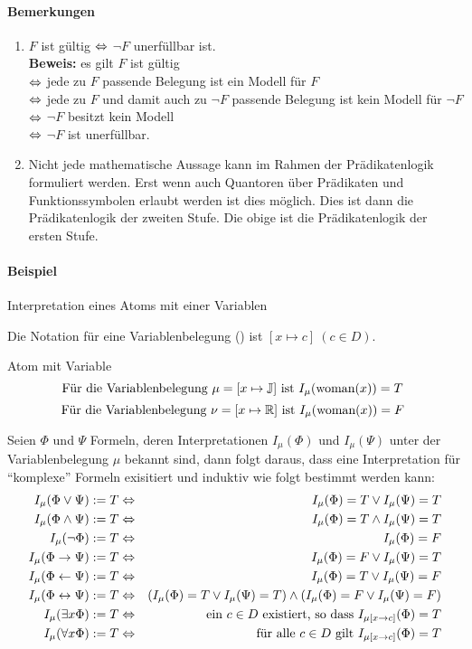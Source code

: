 \documentclass[a4paper]{scrartcl}
\begin{document}
\paragraph{Bemerkungen}
\begin{enumerate}
\item $F$ ist gültig $\Leftrightarrow$ $\neg F$ unerfüllbar ist.\\ \textbf{Beweis:} es gilt $F$ ist gültig 
	\\$\Leftrightarrow$ jede zu $F$ passende Belegung ist ein Modell für $F$ 
	\\$\Leftrightarrow$ jede zu $F$ und damit auch zu $\neg F$ passende Belegung ist kein Modell für $\neg F$ 
	\\$\Leftrightarrow$ $\neg F$ besitzt kein Modell 
	\\$\Leftrightarrow$ $\neg F$ ist unerfüllbar.
\item Nicht jede mathematische Aussage kann im Rahmen der Prädikatenlogik formuliert werden. Erst wenn auch Quantoren über Prädikaten und Funktionssymbolen erlaubt werden ist dies möglich. Dies ist dann die Prädikatenlogik der zweiten Stufe. Die obige ist die Prädikatenlogik der ersten Stufe.
\end{enumerate}

\paragraph{Beispiel} Interpretation eines Atoms mit einer Variablen 

Die Notation für eine Variablenbelegung () ist $[x \mapsto c] \ (c \in D)$.

Atom mit Variable
	$$\text{Für die Variablenbelegung $\mu=[x \mapsto \mathbb{J}] \text{ ist } I_\mu(\text{woman}(x))=T$ }$$
	$$\text{Für die Variablenbelegung $\nu=[x \mapsto \mathbb{R}] \text{ ist } I_\mu(\text{woman}(x))=F$ }$$

Seien $\Phi$ und $\Psi$ Formeln, deren Interpretationen $I_\mu(\Phi)$ und $I_\mu(\Psi)$ unter der Variablenbelegung $\mu$ bekannt sind, dann folgt daraus, dass eine Interpretation für "`komplexe"' Formeln exisitiert und induktiv wie folgt bestimmt werden kann:
\begin{eqnarray*}
I_\mu(\Phi \vee \Psi) := T & \Leftrightarrow & I_\mu(\Phi)=T \vee I_\mu(\Psi)=T \\
I_\mu(\Phi \wedge \Psi) := T & \Leftrightarrow & I_\mu(\Phi)=T \wedge I_\mu(\Psi)=T \\
I_\mu(\neg \Phi) := T & \Leftrightarrow & I_\mu(\Phi)=F \\
I_\mu(\Phi \rightarrow \Psi) := T & \Leftrightarrow & I_\mu(\Phi)=F \vee I_\mu(\Psi)=T \\
I_\mu(\Phi \leftarrow \Psi) := T & \Leftrightarrow & I_\mu(\Phi)=T \vee I_\mu(\Psi)=F \\
I_\mu(\Phi \leftrightarrow \Psi) := T & \Leftrightarrow & (I_\mu(\Phi)=T \vee I_\mu(\Psi)=T) \wedge (I_\mu(\Phi)=F \vee I_\mu(\Psi)=F) \\
I_\mu(\exists x \Phi) := T & \Leftrightarrow & \text{ein $c \in D$ existiert, so dass $I_{\mu[x \rightarrow c]}(\Phi) = T$} \\
I_\mu(\forall x \Phi) := T & \Leftrightarrow & \text{für alle $c \in D$ gilt $I_{\mu[x \rightarrow c]}(\Phi) = T$}
\end{eqnarray*}
\end{document}
